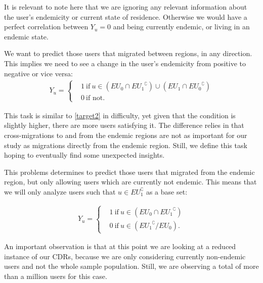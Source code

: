 It is relevant to note here that we are ignoring any relevant information about the user's endemicity or current state of residence.
Otherwise we would have a perfect correlation between $Y_u=0$ and being currently endemic, or living in an endemic state.



\begin{problem}\label{target3}
We want to predict those users that migrated between regions, in any direction. This implies we need to see a change in the user's endemicity from positive to negative or vice versa:
\begin{align*}
			Y_u =
			\begin{cases}
				&1 \ \mbox{if} \ u \in (EU_{0} \cap { EU_{1} }^{\complement}) \cup (EU_{1} \cap { EU_{0} }^{\complement}) \\
				&0 \ \mbox{if not}.
			\end{cases}
		\end{align*}
\end{problem}

This task is similar to \cref{target2} in difficulty, yet given that the condition is slightly higher, there are more users satisfying it.
The difference relies in that cross-migrations to and from the endemic regions are not as important for our study as migrations directly from the endemic region.
Still, we define this task hoping to eventually find some unexpected insights.


\begin{problem}\label{target4}
This problems determines to predict those users that migrated from the endemic region, but only allowing users which are currently not endemic.
This means that we will only analyze users such that $u \in EU_{1}^{\complement}$ as a base set:

\begin{align*}
			Y_u =
			\begin{cases}
				& 1 \ \mbox{if} \ u \in ( EU_{0} \cap { EU_{1} }^{\complement})    \\
				& 0 \ \mbox{if} \ u \in ( { EU_{1} }^{\complement} / EU_{0}).
			\end{cases}
		\end{align*}
\end{problem}

An important observation is that at this point we are looking at a reduced instance of our CDRs, because we are only considering currently non-endemic users and not the whole sample population.
Still, we are observing a total of more than a million users for this case.


